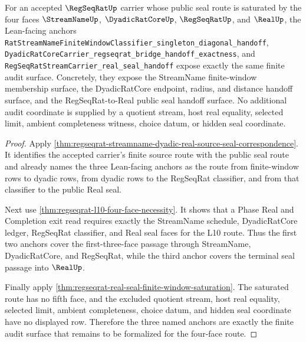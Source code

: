 \begin{theorem}
\label{thm:regseqrat-streamname-dyadic-real-lean-anchor-audit-surface}
For an accepted $\RegSeqRatUp$ carrier whose public seal route is saturated by
the four faces $\StreamNameUp$, $\DyadicRatCoreUp$, $\RegSeqRatUp$, and
$\RealUp$, the Lean-facing anchors
\texttt{RatStreamNameFiniteWindowClassifier\_singleton\_diagonal\_handoff},
\texttt{DyadicRatCoreCarrier\_regseqrat\_bridge\_handoff\_exactness}, and
\texttt{RegSeqRatStreamCarrier\_real\_seal\_handoff} expose exactly the same
finite audit surface. Concretely, they expose the StreamName finite-window
membership surface, the DyadicRatCore endpoint, radius, and distance handoff
surface, and the RegSeqRat-to-Real public seal handoff surface. No additional
audit coordinate is supplied by a quotient stream, host real equality, selected
limit, ambient completeness witness, choice datum, or hidden seal coordinate.
\end{theorem}
\begin{proof}
Apply
\autoref{thm:regseqrat-streamname-dyadic-real-source-seal-correspondence}. It
identifies the accepted carrier's finite source route with the public seal
route and already names the three Lean-facing anchors as the route from
finite-window rows to dyadic rows, from dyadic rows to the RegSeqRat
classifier, and from that classifier to the public Real seal.

Next use \autoref{thm:regseqrat-l10-four-face-necessity}. It shows that a
Phase Real and Completion exit read requires exactly the StreamName schedule,
DyadicRatCore ledger, RegSeqRat classifier, and Real seal faces for the L10
route. Thus the first two anchors cover the first-three-face passage through
StreamName, DyadicRatCore, and RegSeqRat, while the third anchor covers the
terminal seal passage into $\RealUp$.

Finally apply
\autoref{thm:regseqrat-real-seal-finite-window-saturation}. The saturated
route has no fifth face, and the excluded quotient stream, host real equality,
selected limit, ambient completeness, choice datum, and hidden seal coordinate
have no displayed row. Therefore the three named anchors are exactly the
finite audit surface that remains to be formalized for the four-face route.
\end{proof}

